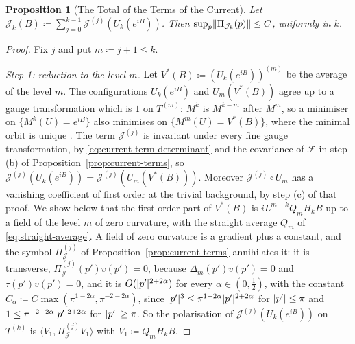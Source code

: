 \documentclass[11pt]{preprint}
\DeclarePairedDelimiter{\abs}{\lvert}{\rvert}
\DeclarePairedDelimiter{\norm}{\lVert}{\rVert}
\numberwithin{equation}{section}
\theoremstyle{definition}
\theoremstyle{remark}
\theoremstyle{plain}
\newtheorem{auxproposition}[lemma]{Proposition}
\begin{document}
\begin{auxproposition}[The Total of the Terms of the Current]\label{prop:current-total}
Let $\mathcal J_k(B) \coloneqq \sum_{j=0}^{k-1}\mathcal J^{(j)}(U_k(e^{iB}))$. Then $\sup_p\norm{\Pi_{\mathcal J_k}(p)} \leq C$, uniformly in $k$.
\end{auxproposition}

\begin{proof}
Fix $j$ and put $m \coloneqq j + 1 \leq k$.

\emph{Step 1: reduction to the level $m$.} Let $V^*(B) \coloneqq (U_k(e^{iB}))^{(m)}$ be the average of the level $m$. The configurations $U_k(e^{iB})$ and $U_m(V^*(B))$ agree up to a gauge transformation which is $1$ on $T^{(m)}$: $M^k$ is $M^{k-m}$ after $M^m$, so a minimiser on $\{ M^k(U) = e^{iB} \}$ also minimises on $\{ M^m(U) = V^*(B) \}$, where the minimal orbit is unique \cite[(0.21)--(0.22), p.~256]{BalabanRG1}. The term $\mathcal J^{(j)}$ is invariant under every fine gauge transformation, by \eqref{eq:current-term-determinant} and the covariance of $\mathcal F$ in step (b) of Proposition~\ref{prop:current-terms}, so $\mathcal J^{(j)}(U_k(e^{iB})) = \mathcal J^{(j)}(U_m(V^*(B)))$. Moreover $\mathcal J^{(j)} \circ U_m$ has a vanishing coefficient of first order at the trivial background, by step (c) of that proof. We show below that the first-order part of $V^*(B)$ is $iL^{m-k}Q_mH_kB$ up to a field of the level $m$ of zero curvature, with the straight average $Q_m$ of \eqref{eq:straight-average}. A field of zero curvature is a gradient plus a constant, and the symbol $\Pi^{(j)}_{\mathcal J}$ of Proposition~\ref{prop:current-terms} annihilates it: it is transverse, $\Pi^{(j)}_{\mathcal J}(p')v(p') = 0$, because $\Delta_m(p')v(p') = 0$ and $\tau(p')v(p') = 0$, and it is $O(\abs{p'}^{2+2\alpha})$ for every $\alpha \in (0, \frac12)$, with the constant $C_\alpha \coloneqq C\max(\pi^{1-2\alpha}, \pi^{-2-2\alpha})$, since $\abs{p'}^3 \leq \pi^{1-2\alpha}\abs{p'}^{2+2\alpha}$ for $\abs{p'} \leq \pi$ and $1 \leq \pi^{-2-2\alpha}\abs{p'}^{2+2\alpha}$ for $\abs{p'} \geq \pi$. So the polarisation of $\mathcal J^{(j)}(U_k(e^{iB}))$ on $T^{(k)}$ is $\langle V_1, \Pi^{(j)}_{\mathcal J}V_1 \rangle$ with $V_1 \coloneqq Q_mH_kB$.


\end{proof}
\end{document}

